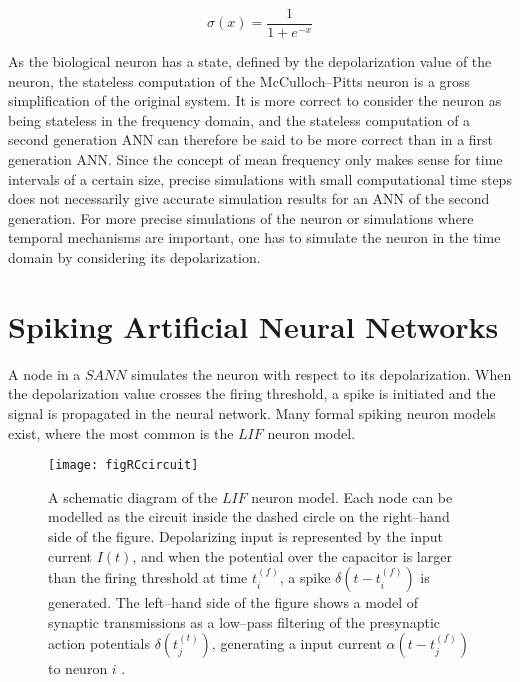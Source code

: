 \begin{equation}
	\sigma(x)=\frac{1}{1+e^{-x}}   %
\end{equation}
	
	As the biological neuron has a state, defined by the depolarization value of the neuron, the stateless computation of the McCulloch--Pitts neuron is a gross simplification of the original system.
	It is more correct to consider the neuron as being stateless in the frequency domain, and the stateless computation of a second generation ANN can therefore be said to be more correct than in a first generation ANN\cite{Maass97networksofSN, FDP_report}.
	Since the concept of mean frequency only makes sense for time intervals of a certain size, precise simulations with small computational time steps does not necessarily give accurate simulation results for an ANN of the second generation. 
	For more precise simulations of the neuron or simulations where temporal mechanisms are important, one has to simulate the neuron in the time domain by considering its depolarization.




\section{Spiking Artificial Neural Networks}
	\label{secSpikingANNBackgroundInfo}
	A node in a $SANN$ simulates the neuron with respect to its depolarization.
	When the depolarization value crosses the firing threshold, a spike is initiated and the signal is propagated in the neural network.
	Many formal spiking neuron models exist, where the most common is the $LIF$ neuron model\cite{florian03}. %
	
	
\begin{figure}[tb!hp]
	\centering
	\texttt{[image: figRCcircuit]}
	\caption[A schematic diagram of the $LIF$ neuron model]
			{A schematic diagram of the $LIF$ neuron model. 
			Each node can be modelled as the circuit inside the dashed circle on the right--hand side of the figure.
			Depolarizing input is represented by the input current $I(t)$, and when the potential over the capacitor is larger than the firing threshold at time $t_i^{(f)}$, a spike $\delta(t-t_i^{(f)})$ is generated. 
			The left--hand side of the figure shows a model of synaptic transmissions as a low--pass filtering of the presynaptic action potentials $\delta(t_j^{(t)})$, generating a input current $\alpha(t-t_j^{(f)})$ to neuron $i$
			\cite{gerstnerKistler2002}.
			}
	\label{figRCcircuitAvNeuronet}
\end{figure}

